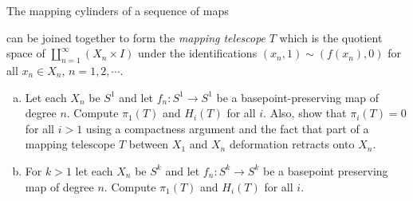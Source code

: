\documentclass{article}
\begin{document}
\begin{problem}{6}{\parindent}
  The mapping cylinders of a sequence of maps
  \begin{center}
  \end{center}
  can be joined together to form the \emph{mapping telescope} $T$
  which is the quotient space of $\coprod_{n=1}^\infty (X_n \times I)$
  under the identifications $(x_n,1) \sim (f(x_n),0)$ for all $x_n \in
  X_n$, $n = 1,2,\cdots$.
  \begin{enumerate}[(a)]
  \item Let each $X_n$ be $S^1$ and let $f_n: S^1 \to S^1$ be a
    basepoint-preserving map of degree $n$. Compute $\pi_1(T)$ and
    $H_i(T)$ for all $i$. Also, show that $\pi_i(T) = 0$ for all $i >
    1$ using a compactness argument and the fact that part of a
    mapping telescope $T$ between $X_1$ and $X_n$ deformation retracts
    onto $X_n$.
  \item For $k > 1$ let each $X_n$ be $S^k$ and let $f_n: S^k \to S^k$
    be a basepoint preserving map of degree $n$. Compute $\pi_1(T)$
    and $H_i(T)$ for all $i$.
  \end{enumerate}
\end{problem}
\end{document}
